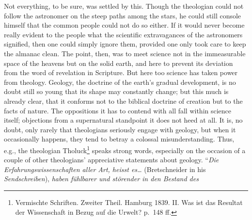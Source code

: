 \documentclass[12pt,a4paper]{article}
\begin{document}
Not everything, to be sure, was settled by this. Though the
theologian could not follow the astronomer on the steep paths among
the stars, he could still console himself that the common people
could not do so either. If it would never become really evident to
the people what the scientific extravagances of the astronomers
signified, then one could simply ignore them, provided one only took
care to keep the almanac clean. The point, then, was to meet science
not in the immeasurable space of the heavens but on the solid earth,
and here to prevent its deviation from the word of revelation in
Scripture. But here too science has taken power from theology.
Geology, the doctrine of the earth's gradual development, is no doubt
still so young that its shape may constantly change; but this much is
already clear, that it conforms not to the biblical doctrine of
creation but to the facts of nature. The oppositions it has to contend
with all fall within science itself; objections from a supernatural
standpoint it does not heed at all. It is, no doubt, only rarely that
theologians seriously engage with geology, but when it occasionally
happens, they tend to betray a colossal misunderstanding. Thus, e.g.,
the theologian Tholuck\footnote{Vermischte Schriften. Zweiter Theil. Hamburg 1839. II. Was ist
das Resultat der Wissenschaft in Bezug auf die Urwelt? p.\ 148
ff.} %
speaks strong words, especially on the occasion of a couple of other
theologians' appreciative statements about geology. ``\textit{Die
Erfahrungswissenschaften aller Art, heisst es\ldots} (Bretschneider in
his \textit{Sendschreiben}), \textit{haben fühlbarer und störender in
den Bestand des}
\end{document}
